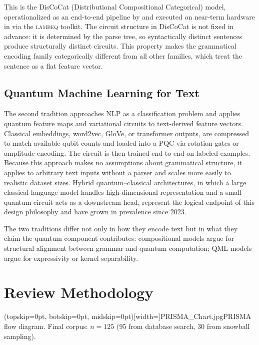 \documentclass{ieeeaccess}
\begin{document}
This is the DisCoCat (Distributional Compositional Categorical) model, operationalized as an end-to-end pipeline by \cite{lorenz_qnlp_2023} and executed on near-term hardware in \cite{meichanetzidis_quantum_2021, meichanetzidis_grammar-aware_2023} via the \textsc{lambeq} toolkit. The circuit structure in DisCoCat is not fixed in advance: it is determined by the parse tree, so syntactically distinct sentences produce structurally distinct circuits. This property makes the grammatical encoding family categorically different from all other families, which treat the sentence as a flat feature vector.

\subsection{Quantum Machine Learning for Text}

The second tradition approaches NLP as a classification problem and applies quantum feature maps \cite{schuld2019quantum} and variational circuits \cite{cerezo2021variational} to text-derived feature vectors. Classical embeddings, word2vec, GloVe, or transformer outputs, are compressed to match available qubit counts and loaded into a PQC via rotation gates or amplitude encoding. The circuit is then trained end-to-end on labeled examples. Because this approach makes no assumptions about grammatical structure, it applies to arbitrary text inputs without a parser and scales more easily to realistic dataset sizes. Hybrid quantum--classical architectures, in which a large classical language model handles high-dimensional representation and a small quantum circuit acts as a downstream head, represent the logical endpoint of this design philosophy and have grown in prevalence since 2023.

The two traditions differ not only in how they encode text but in what they claim the quantum component contributes: compositional models argue for structural alignment between grammar and quantum computation; QML models argue for expressivity or kernel separability. 

\section{Review Methodology}
\label{sec:method}

\Figure[t!](topskip=0pt, botskip=0pt, midskip=0pt)[width=\textwidth]{PRISMA_Chart.jpg}{PRISMA flow diagram. Final corpus: $n = 125$ (95 from database search, 30 from snowball sampling).\label{fig:prisma}}
\end{document}

